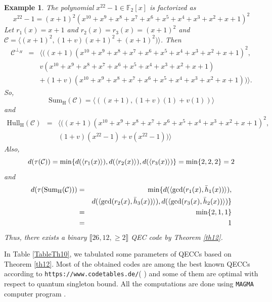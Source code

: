 \documentclass[pdflatex,sn-mathphys-num]{sn-jnl}%
\theoremstyle{thmstyleone}%
\theoremstyle{thmstyletwo}%
\newtheorem{example}{Example}%
\theoremstyle{thmstylethree}%
\begin{document}
\begin{example}
The polynomial $x^{22}-1\in \mathbb{F}_{2}[x]$ is factorized as
\begin{equation*}
x^{22}-1=(x+1)^{2}\left(
x^{10}+x^{9}+x^{8}+x^{7}+x^{6}+x^{5}+x^{4}+x^{3}+x^{2}+x+1\right) ^{2}
\end{equation*}
Let $r_{1}(x)=x+1$ and $r_{2}(x)=r_{3}(x)=(x+1)^{2}$ and $\mathcal{C}=\langle (x+1)^{2},(1+v)(x+1)^{2}+(x+1)^{2})\rangle $. Then
\begin{eqnarray*}
\mathcal{C}^{\perp _{H}} &=&\langle ((x+1)\left(
x^{10}+x^{9}+x^{8}+x^{7}+x^{6}+x^{5}+x^{4}+x^{3}+x^{2}+x+1\right) ^{2}, \\
&&v\left( x^{10}+x^{9}+x^{8}+x^{7}+x^{6}+x^{5}+x^{4}+x^{3}+x^{2}+x+1\right)
\\
&&+(1+v)\left(
x^{10}+x^{9}+x^{8}+x^{7}+x^{6}+x^{5}+x^{4}+x^{3}+x^{2}+x+1\right) )\rangle .
\end{eqnarray*}
So,
\begin{equation*}
\mathrm{Sum_{H}}(\mathcal{C})=\langle ((x+1),(1+v)(1)+v(1))\rangle
\end{equation*}
and
\begin{eqnarray*}
\mathrm{Hull_{H}}(\mathcal{C}) &=&\langle ((x+1)\left(
x^{10}+x^{9}+x^{8}+x^{7}+x^{6}+x^{5}+x^{4}+x^{3}+x^{2}+x+1\right) ^{2}, \\
&&(1+v)(x^{22}-1)+v(x^{22}-1))\rangle
\end{eqnarray*}
Also,
\begin{equation*}
d(\tau (\mathcal{C}))=\mathrm{\min }\{d(\langle r_{1}(x)\rangle ),d(\langle
r_{2}(x)\rangle ),d(\langle r_{3}(x)\rangle )\} \\
=\mathrm{\min }\{2,2,2\} \\
=2
\end{equation*}
and
\begin{eqnarray*}
d(\tau (\mathrm{Sum_{H}}(\mathcal{C}))) &=&\mathrm{\min }\{d(\langle \mathrm{\gcd }(r_{1}(x),\Bar{h}_{1}(x))\rangle ), \\
&&d(\langle \mathrm{\gcd }(r_{2}(x),\Bar{h}_{3}(x))\rangle ),d(\langle
\mathrm{\gcd }(r_{3}(x),\Bar{h}_{2}(x))\rangle )\} \\
&=&\mathrm{\min }\{2,1,1\} \\
&=&1
\end{eqnarray*}
Thus, there exists a binary $\llbracket26,12,\geq 2\rrbracket$ QEC code by
Theorem \ref{th12}.
\end{example}
In Table \ref{TableTh10}, we tabulated some parameters of QECCs based on Theorem \ref{th12}. Most of the obtained codes are among the best known QECCs  according to \texttt{https://www.codetables.de/}( \cite{Grassl:codetables}) and some of them are optimal with respect to quantum singleton bound. All the computations are done using \verb"MAGMA" computer program \cite{bosma1997magma}.
\end{document}
